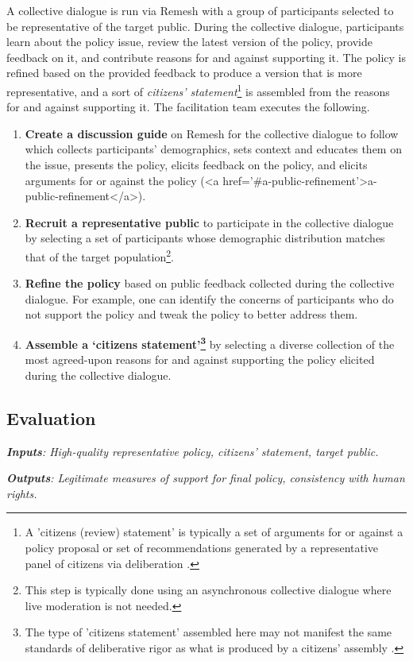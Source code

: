\documentclass{article}
\begin{document}
A collective dialogue is run via Remesh with a group of participants selected to be representative of the target public. During the collective dialogue, participants learn about the policy issue, review the latest version of the policy, provide feedback on it, and contribute reasons for and against supporting it. The policy is refined based on the provided feedback to produce a version that is more representative, and a sort of \emph{citizens' statement}\footnote{A 'citizens (review) statement' is typically a set of arguments for or against a policy proposal or set of recommendations generated by a representative panel of citizens via deliberation \cite{citizens2018}.} is assembled from the reasons for and against supporting it. The facilitation team executes the following.
\begin{enumerate}
\item \textbf{Create a discussion guide} on Remesh for the collective dialogue to follow which collects participants' demographics, sets context and educates them on the issue, presents the policy, elicits feedback on the policy, and elicits arguments for or against the policy (<a href='#a-public-refinement'>a-public-refinement</a>).
\item \textbf{Recruit a representative public} to participate in the collective dialogue by selecting a set of participants whose demographic distribution matches that of the target population\footnote{This step is typically done using an asynchronous collective dialogue where live moderation is not needed.}. 
\item \textbf{Refine the policy} based on public feedback collected during the collective dialogue. For example, one can identify the concerns of participants who do not support the policy and tweak the policy to better address them.
\item \textbf{Assemble a `citizens statement'\footnote{The type of 'citizens statement' assembled here may not manifest the same standards of deliberative rigor as what is produced by a citizens' assembly \cite{citizens2018}.}} by selecting a diverse collection of the most agreed-upon reasons for and against supporting the policy elicited during the collective dialogue. 
\end{enumerate}

 

\subsection{Evaluation}
\begin{tcolorbox}[colback=blue!5!white,colframe=blue!30!white]
\emph{\textbf{Inputs}: High-quality representative policy, citizens’ statement, target public.}

\emph{\textbf{Outputs}: Legitimate measures of support for final policy, consistency with human rights.}
\end{tcolorbox}
\end{document}
